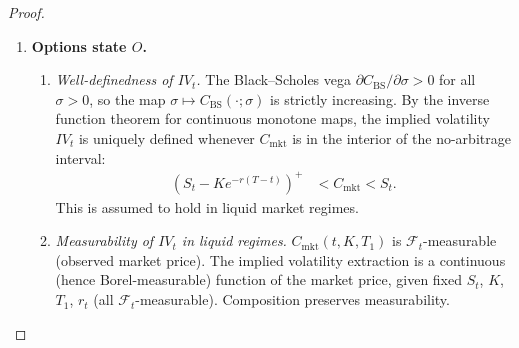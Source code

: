 \documentclass[12pt,openany]{book}
\newcommand{\calF}{\mathcal{F}}
\newcommand{\E}{\mathbb{E}}
\numberwithin{equation}{chapter}
\theoremstyle{plain}
\theoremstyle{definition}
\theoremstyle{remark}
\numberwithin{equation}{chapter}
\theoremstyle{plain}
\begin{document}
\begin{proof}
\begin{enumerate}
\begin{enumerate}
      \item \emph{Finiteness.}
        \begin{align}
          \hat{\sigma}_t^2
            &= (1-\lambda)\sum_{k=0}^{\infty} \lambda^k R_{t-k}^2
             \leq
               \frac{1-\lambda}{1-\lambda}
               \sup_{k \geq 0} R_{t-k}^2
             = \sup_{k \geq 0} R_{t-k}^2.
        \end{align}
        Since $\E[R_t^2] < \infty$ for all $t$ by
        Assumption~\ref{asm:return-process}, the random variable
        $\hat{\sigma}_t^2$ is finite a.s.

      \item \emph{Measurability and domain of $V_{\mathrm{vol}}$.}
        The square root $\sqrt{\cdot} : (0,\infty) \to (0,\infty)$
        is continuous, hence Borel-measurable.
        With $\tau > 0$ deterministic:
        \begin{align}
          V_{\mathrm{vol}}
            &= \sqrt{\hat{\sigma}_t^2 \cdot \tau}
             \in (0, \infty)
             \quad \text{a.s.}
        \end{align}
    \end{enumerate}

  \item \textbf{Options state $O$.}

    \begin{enumerate}
      \item \emph{Well-definedness of $IV_t$.}
        The Black--Scholes vega
        $\partial C_{\mathrm{BS}} / \partial \sigma > 0$
        for all $\sigma > 0$, so the map
        $\sigma \mapsto C_{\mathrm{BS}}(\cdot;\sigma)$ is
        strictly increasing.
        By the inverse function theorem for continuous monotone
        maps, the implied volatility $IV_t$ is uniquely defined
        whenever $C_{\mathrm{mkt}}$ is in the interior of the
        no-arbitrage interval:
        \begin{align}
          (S_t - K e^{-r(T-t)})^+
            &< C_{\mathrm{mkt}}
             < S_t.
        \end{align}
        This is assumed to hold in liquid market regimes.

      \item \emph{Measurability of $IV_t$ in liquid regimes.}
        $C_{\mathrm{mkt}}(t, K, T_1)$ is $\calF_t$-measurable
        (observed market price).
        The implied volatility extraction is a continuous
        (hence Borel-measurable) function of the market price,
        given fixed $S_t$, $K$, $T_1$, $r_t$ (all
        $\calF_t$-measurable).
        Composition preserves measurability.


\end{enumerate}
\end{enumerate}
\end{proof}
\end{document}
